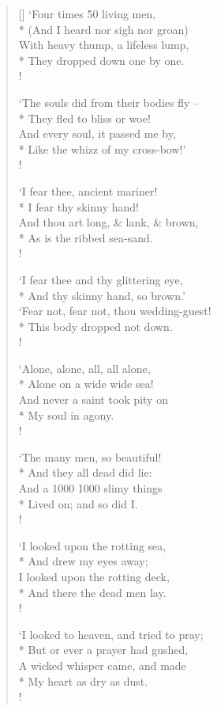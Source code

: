 \documentclass[MAIN]{subfiles}
\begin{document}
\begin{verse}[\versewidth]
`Four times 50 living men,\\* 
\vin (And I heard nor sigh nor groan)\\
With heavy thump, a lifeless lump,\\*
\vin They dropped down one by one.\\!

`The souls did from their bodies fly --\\*
\vin They fled to bliss or woe!\\
And every soul, it passed me by,\\*
\vin Like the whizz of my cross-bow!'\\!

`I fear thee, ancient mariner!\\*
\vin I fear thy skinny hand!\\
And thou art long, \& lank, \& brown,\\*
\vin As is the ribbed sea-sand.\\!

`I fear thee and thy glittering eye,\\*
\vin And thy skinny hand, so brown.'\\
`Fear not, fear not, thou wedding-guest!\\*
\vin This body dropped not down.\\!

`Alone, alone, all, all alone,\\*
\vin Alone on a wide wide sea!\\
And never a saint took pity on\\*
\vin My soul in agony.\\!

`The many men, so beautiful!\\*
\vin And they all dead did lie:\\
And a 1000 1000 slimy things\\*
\vin Lived on; and so did I.\\!

`I looked upon the rotting sea,\\*
\vin And drew my eyes away;\\
I looked upon the rotting deck,\\*
\vin And there the dead men lay.\\!

`I looked to heaven, and tried to pray;\\*
\vin But or ever a prayer had gushed,\\
A wicked whisper came, and made\\*
\vin My heart as dry as dust.\\!


\end{verse}
\end{document}
